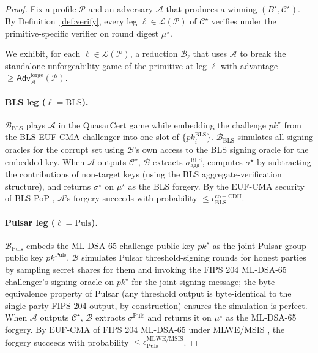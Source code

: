 \begin{proof}
Fix a profile $\mathcal{P}$ and an adversary $\mathcal{A}$ that
produces a winning $(B^{\star}, \mathcal{C}^{\star})$. By
Definition~\ref{def:verify}, every leg $\ell \in \mathcal{L}(\mathcal{P})$
of $\mathcal{C}^{\star}$ verifies under the primitive-specific verifier
on round digest $\mu^{\star}$.

We exhibit, for each $\ell \in \mathcal{L}(\mathcal{P})$, a reduction
$\mathcal{B}_\ell$ that uses $\mathcal{A}$ to break the standalone
unforgeability game of the primitive at leg $\ell$ with advantage
$\geq \mathsf{Adv}^{\mathrm{forge}}_{\mathcal{A}}(\mathcal{P})$.

\paragraph{BLS leg ($\ell = \mathrm{BLS}$).} $\mathcal{B}_{\mathrm{BLS}}$
plays $\mathcal{A}$ in the QuasarCert game while embedding the
challenge $\mathit{pk}^{\star}$ from the BLS EUF-CMA challenger into
one slot of $\{\mathit{pk}_i^{\mathrm{BLS}}\}$. $\mathcal{B}_{\mathrm{BLS}}$
simulates all signing oracles for the corrupt set using
$\mathcal{B}$'s own access to the BLS signing oracle for the embedded
key. When $\mathcal{A}$ outputs $\mathcal{C}^{\star}$, $\mathcal{B}$
extracts $\sigma^{\mathrm{BLS}}_{\mathrm{agg}}$, computes
$\sigma^{\star}$ by subtracting the contributions of non-target keys
(using the BLS aggregate-verification structure), and returns
$\sigma^{\star}$ on $\mu^{\star}$ as the BLS forgery. By the
EUF-CMA security of BLS-PoP \cite{boneh2001short}, $\mathcal{A}$'s
forgery succeeds with probability $\leq \epsilon_{\mathrm{BLS}}^{\mathrm{co-CDH}}$.

\paragraph{Pulsar leg ($\ell = \mathrm{Puls}$).} $\mathcal{B}_{\mathrm{Puls}}$
embeds the ML-DSA-65 challenge public key $\mathit{pk}^{\star}$ as
the joint Pulsar group public key $\mathit{pk}^{\mathrm{Puls}}$.
$\mathcal{B}$ simulates Pulsar threshold-signing rounds for honest
parties by sampling secret shares for them and invoking the FIPS 204
ML-DSA-65 challenger's signing oracle on $\mathit{pk}^{\star}$ for
the joint signing message; the byte-equivalence property of Pulsar
(any threshold output is byte-identical to the single-party FIPS 204
output, by construction) ensures the simulation is perfect. When
$\mathcal{A}$ outputs $\mathcal{C}^{\star}$, $\mathcal{B}$ extracts
$\sigma^{\mathrm{Puls}}$ and returns it on $\mu^{\star}$ as the
ML-DSA-65 forgery. By EUF-CMA of FIPS 204 ML-DSA-65 under MLWE/MSIS
\cite{fips204,dilithium}, the forgery succeeds with probability
$\leq \epsilon_{\mathrm{Puls}}^{\mathrm{MLWE/MSIS}}$.


\end{proof}
